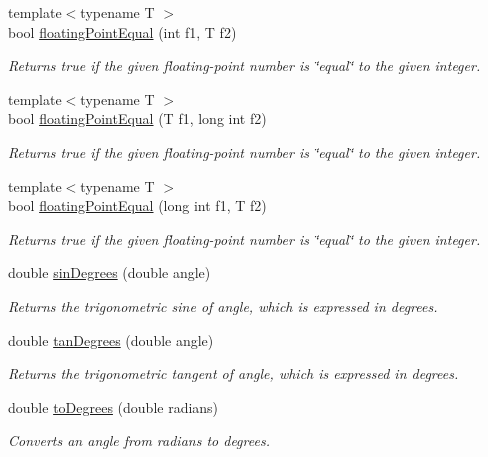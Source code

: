 \begin{DoxyCompactItemize}
{\footnotesize template$<$typename T $>$ }\\bool \mbox{\hyperlink{namespacesgl_1_1math_a9b4e05df733b8d63900cc0afe34c8f65}{floating\+Point\+Equal}} (int f1, T f2)
\begin{DoxyCompactList}\small\item\em Returns true if the given floating-\/point number is \char`\"{}equal\char`\"{} to the given integer. \end{DoxyCompactList}\item 
{\footnotesize template$<$typename T $>$ }\\bool \mbox{\hyperlink{namespacesgl_1_1math_a9d31d4ec73028f15de956918e995ab8b}{floating\+Point\+Equal}} (T f1, long int f2)
\begin{DoxyCompactList}\small\item\em Returns true if the given floating-\/point number is \char`\"{}equal\char`\"{} to the given integer. \end{DoxyCompactList}\item 
{\footnotesize template$<$typename T $>$ }\\bool \mbox{\hyperlink{namespacesgl_1_1math_a7a7e3a5c83560704420311746c3f31ae}{floating\+Point\+Equal}} (long int f1, T f2)
\begin{DoxyCompactList}\small\item\em Returns true if the given floating-\/point number is \char`\"{}equal\char`\"{} to the given integer. \end{DoxyCompactList}\item 
double \mbox{\hyperlink{namespacesgl_1_1math_a14399b27986d63b0ab2df12e3bc80897}{sin\+Degrees}} (double angle)
\begin{DoxyCompactList}\small\item\em Returns the trigonometric sine of {\ttfamily angle}, which is expressed in degrees. \end{DoxyCompactList}\item 
double \mbox{\hyperlink{namespacesgl_1_1math_a32f462a3ccaa75b0d53ab30b9ff72394}{tan\+Degrees}} (double angle)
\begin{DoxyCompactList}\small\item\em Returns the trigonometric tangent of {\ttfamily angle}, which is expressed in degrees. \end{DoxyCompactList}\item 
double \mbox{\hyperlink{namespacesgl_1_1math_a743ea7ec7653fe3ee75df86682edbb04}{to\+Degrees}} (double radians)
\begin{DoxyCompactList}\small\item\em Converts an angle from radians to degrees. \end{DoxyCompactList}\item 

\end{DoxyCompactItemize}
